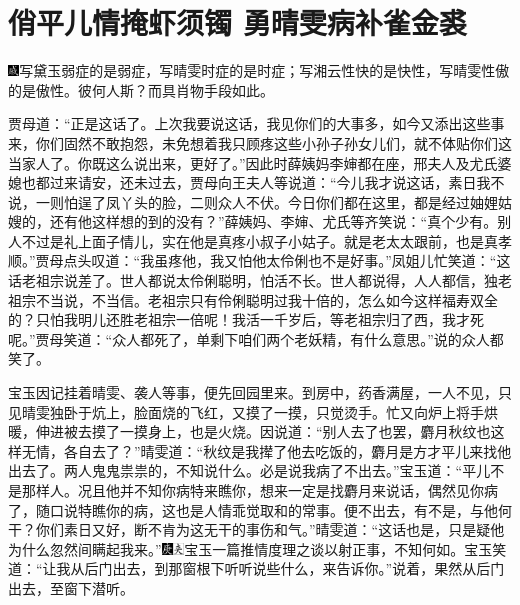 

\chapter{俏平儿情掩虾须镯 勇晴雯病补雀金裘}

{\includegraphics[width=3mm]{../Images/00005}写黛玉弱症的是弱症，写晴雯时症的是时症；写湘云性快的是快性，写晴雯性傲的是傲性。彼何人斯？而具肖物手段如此。}

贾母道：``正是这话了。上次我要说这话，我见你们的大事多，如今又添出这些事来，你们固然不敢抱怨，未免想着我只顾疼这些小孙子孙女儿们，就不体贴你们这当家人了。你既这么说出来，更好了。''因此时薛姨妈李婶都在座，邢夫人及尤氏婆媳也都过来请安，还未过去，贾母向王夫人等说道：``今儿我才说这话，素日我不说，一则怕逞了凤丫头的脸，二则众人不伏。今日你们都在这里，都是经过妯娌姑嫂的，还有他这样想的到的没有？''薛姨妈、李婶、尤氏等齐笑说：``真个少有。别人不过是礼上面子情儿，实在他是真疼小叔子小姑子。就是老太太跟前，也是真孝顺。''贾母点头叹道：``我虽疼他，我又怕他太伶俐也不是好事。''凤姐儿忙笑道：``这话老祖宗说差了。世人都说太伶俐聪明，怕活不长。世人都说得，人人都信，独老祖宗不当说，不当信。老祖宗只有伶俐聪明过我十倍的，怎么如今这样福寿双全的？只怕我明儿还胜老祖宗一倍呢！我活一千岁后，等老祖宗归了西，我才死呢。''贾母笑道：``众人都死了，单剩下咱们两个老妖精，有什么意思。''说的众人都笑了。

宝玉因记挂着晴雯、袭人等事，便先回园里来。到房中，药香满屋，一人不见，只见晴雯独卧于炕上，脸面烧的飞红，又摸了一摸，只觉烫手。忙又向炉上将手烘暖，伸进被去摸了一摸身上，也是火烧。因说道：``别人去了也罢，麝月秋纹也这样无情，各自去了？''晴雯道：``秋纹是我撵了他去吃饭的，麝月是方才平儿来找他出去了。两人鬼鬼祟祟的，不知说什么。必是说我病了不出去。''宝玉道：``平儿不是那样人。况且他并不知你病特来瞧你，想来一定是找麝月来说话，偶然见你病了，随口说特瞧你的病，这也是人情乖觉取和的常事。便不出去，有不是，与他何干？你们素日又好，断不肯为这无干的事伤和气。''晴雯道：``这话也是，只是疑他为什么忽然间瞒起我来。''{\includegraphics[width=3mm]{../Images/00004}\includegraphics[width=3mm]{../Images/00012}\footnotesize \kaishu 宝玉一篇推情度理之谈以射正事，不知何如。}宝玉笑道：``让我从后门出去，到那窗根下听听说些什么，来告诉你。''说着，果然从后门出去，至窗下潜听。

